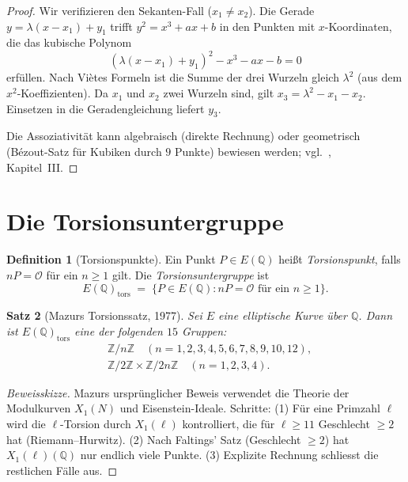 \documentclass[12pt,a4paper]{amsart}
\newtheorem{theorem}{Satz}[section]
\theoremstyle{definition}
\newtheorem{definition}[theorem]{Definition}
\newcommand{\Z}{\mathbb{Z}}
\newcommand{\Q}{\mathbb{Q}}
\begin{document}
\begin{proof}
Wir verifizieren den Sekanten-Fall ($x_1 \ne x_2$).
Die Gerade $y = \lambda(x-x_1)+y_1$ trifft $y^2 = x^3+ax+b$ in den Punkten
mit $x$-Koordinaten, die das kubische Polynom
\[
  (\lambda(x-x_1)+y_1)^2 - x^3 - ax - b = 0
\]
erf\"ullen.
Nach Vi\`etes Formeln ist die Summe der drei Wurzeln gleich $\lambda^2$
(aus dem $x^2$-Koeffizienten).
Da $x_1$ und $x_2$ zwei Wurzeln sind, gilt $x_3 = \lambda^2 - x_1 - x_2$.
Einsetzen in die Geradengleichung liefert $y_3$.

Die Assoziativit\"at kann algebraisch (direkte Rechnung) oder geometrisch
(B\'ezout-Satz f\"ur Kubiken durch $9$ Punkte) bewiesen werden;
vgl.\ \cite{Silverman1986}, Kapitel~III.
\end{proof}

\section{Die Torsionsuntergruppe}

\begin{definition}[Torsionspunkte]
\label{def:torsion}
Ein Punkt $P \in E(\Q)$ hei\ss t \emph{Torsionspunkt}, falls $nP = \mathcal{O}$
f\"ur ein $n \ge 1$ gilt. Die \emph{Torsionsuntergruppe} ist
\[
  E(\Q)_{\mathrm{tors}} \;=\; \{P \in E(\Q) : nP = \mathcal{O}
  \text{ f\"ur ein } n \ge 1\}.
\]
\end{definition}

\begin{theorem}[Mazurs Torsionssatz, 1977]
\label{thm:mazur}
Sei $E$ eine elliptische Kurve \"uber $\Q$. Dann ist $E(\Q)_{\mathrm{tors}}$
eine der folgenden $15$ Gruppen:
\begin{align*}
  &\Z/n\Z \quad (n = 1, 2, 3, 4, 5, 6, 7, 8, 9, 10, 12), \\
  &\Z/2\Z \times \Z/2n\Z \quad (n = 1, 2, 3, 4).
\end{align*}
\end{theorem}

\begin{proof}[Beweisskizze]
Mazurs urspr\"unglicher Beweis \cite{Mazur1977} verwendet die Theorie der
Modulkurven $X_1(N)$ und Eisenstein-Ideale.
Schritte: (1) F\"ur eine Primzahl $\ell$ wird die $\ell$-Torsion durch
$X_1(\ell)$ kontrolliert, die f\"ur $\ell \ge 11$ Geschlecht $\ge 2$ hat
(Riemann--Hurwitz). (2) Nach Faltings' Satz (Geschlecht $\ge 2$) hat
$X_1(\ell)(\Q)$ nur endlich viele Punkte. (3) Explizite Rechnung schliesst
die restlichen F\"alle aus.
\end{proof}
\end{document}
